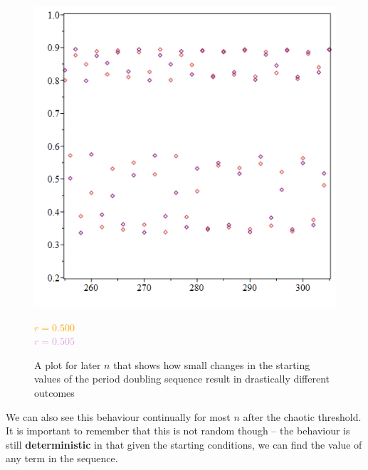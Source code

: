 \documentclass[12pt]{article}
\begin{document}
\begin{figure}[H]
	\begin{minipage}{0.725\textwidth}
		\hfill
		\includegraphics[scale=0.4]{butterfly2.png}
	\end{minipage}
	\hfill
	\begin{minipage}{0.2\textwidth}
		\textcolor{orange}{$ r=0.500 $}\\\textcolor{Plum}{$ r=0.505 $}
	\end{minipage}
	\caption{A plot for later $n$ that shows how small changes in the starting values of the period doubling sequence result in drastically different outcomes}
	\label{fig:mobFix}
\end{figure}
We can also see this behaviour continually for most $n$ after the chaotic threshold. It is important to remember that this is not random though -- the behaviour is still \textbf{deterministic} in that given the starting conditions, we can find the value of any term in the sequence.
\newpage
\end{document}
